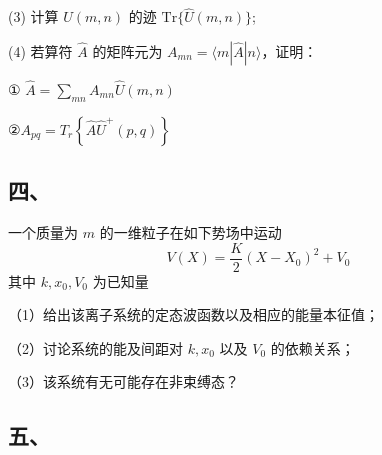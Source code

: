 (3) 计算 $\hat{U}(m,n)$ 的迹 $\mathrm{Tr}\{\hat{U}(m,n)\}$;

(4) 若算符 $\hat{A}$ 的矩阵元为 $A_{mn} = \langle m|\hat{A}|n\rangle$，证明：

① $\hat{A} =\sum_{mn} A_{mn} \hat{U}(m,n)$

②$A_{pq} =T_r\left\{\hat{A}\hat{U}^+(p,q)\right\}$
\subsection{四、}
一个质量为 $m$ 的一维粒子在如下势场中运动
$$V(X)=\frac{K}{2}(X-X_0)^2+V_0~$$
其中 $k, x_0, V_0$ 为已知量

（1）给出该离子系统的定态波函数以及相应的能量本征值；

（2）讨论系统的能及间距对 $k,x_0$ 以及 $V_0$ 的依赖关系；

（3）该系统有无可能存在非束缚态？
\subsection{五、}
